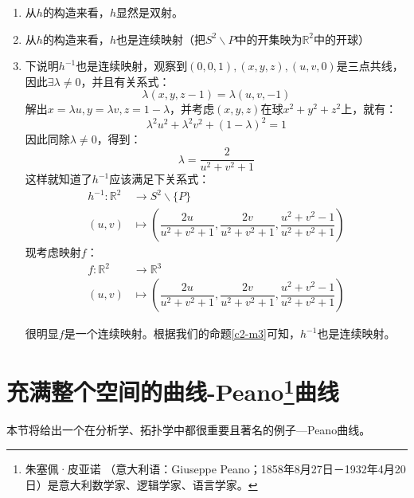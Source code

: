 \documentclass[lang=cn,10pt,device=pad]{elegantbook}
\newcommand{\dkh}[1]{\{#1\}}
\newcommand{\xkh}[1]{\left(#1\right)}
\newcommand{\chadiao}{\backslash}
\begin{document}
\begin{example}[球极投影]
\begin{enumerate}
		\item 从$h$的构造来看，$h$显然是双射。
		\item 从$h$的构造来看，$h$也是连续映射（把$S^{2}\chadiao P$中的开集映为$\mathbb{R}^{2}$中的开球）
		\item 下说明$h^{-1}$也是连续映射，观察到$(0,0,1),(x,y,z),(u,v,0)$是三点共线，因此$\exists \lambda\neq 0$，并且有关系式：
		\begin{equation*}
			\lambda(x,y,z-1)=\lambda(u,v,-1)
		\end{equation*}
		解出$x=\lambda u,y=\lambda v,z=1-\lambda$，并考虑$(x,y,z)$在球$x^{2}+y^{2}+z^{2}$上，就有：
		\begin{equation*}
			\lambda^{2}u^{2}+\lambda^{2}v^{2}+(1-\lambda)^{2} = 1
		\end{equation*}
		因此同除$\lambda \neq 0$，得到：
		\begin{equation*}
			\lambda=\dfrac{2}{u^{2}+v^{2}+1}
		\end{equation*}
		这样就知道了$h^{-1}$应该满足下关系式：
		\begin{equation*}
			\begin{aligned}
				h^{-1}:\mathbb{R}^{2}&\longrightarrow S^{2}\chadiao \dkh{P}\\
				(u,v)&\longmapsto \xkh{\dfrac{2u}{u^{2}+v^{2}+1},\dfrac{2v}{u^{2}+v^{2}+1},\dfrac{u^{2}+v^{2}-1}{u^{2}+v^{2}+1}}
			\end{aligned}
		\end{equation*}
		现考虑映射$f$：
		\begin{equation*}
			\begin{aligned}
				f:\mathbb{R}^{2}&\longrightarrow \mathbb{R}^{3}\\
				(u,v)&\longmapsto \xkh{\dfrac{2u}{u^{2}+v^{2}+1},\dfrac{2v}{u^{2}+v^{2}+1},\dfrac{u^{2}+v^{2}-1}{u^{2}+v^{2}+1}}
			\end{aligned}
		\end{equation*}
		
		很明显$f$是一个连续映射。根据我们的命题\ref{c2-m3}可知，$h^{-1}$也是连续映射。
	\end{enumerate}
\end{example}
\section{充满整个空间的曲线-Peano\footnote{朱塞佩·皮亚诺 （意大利语：Giuseppe Peano；1858年8月27日－1932年4月20日）是意大利数学家、逻辑学家、语言学家。}曲线}
本节将给出一个在分析学、拓扑学中都很重要且著名的例子---Peano曲线。
\end{document}
